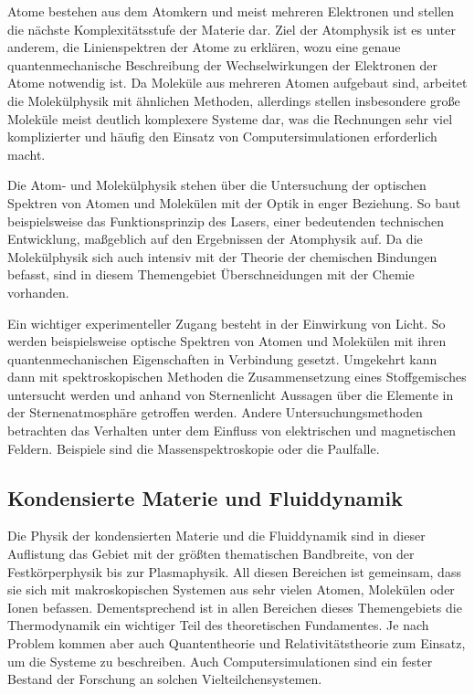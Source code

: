 \documentclass[titlepage, parkskip=full, twocolumn, landscape]{scrartcl}
\begin{document}
Atome bestehen aus dem Atomkern und meist mehreren Elektronen und stellen die nächste Komplexitätsstufe der Materie dar. Ziel der Atomphysik ist es unter anderem, die Linienspektren der Atome zu erklären, wozu eine genaue quantenmechanische Beschreibung der Wechselwirkungen der Elektronen der Atome notwendig ist. Da Moleküle aus mehreren Atomen aufgebaut sind, arbeitet die Molekülphysik mit ähnlichen Methoden, allerdings stellen insbesondere große Moleküle meist deutlich komplexere Systeme dar, was die Rechnungen sehr viel komplizierter und häufig den Einsatz von Computersimulationen erforderlich macht.

Die Atom- und Molekülphysik stehen über die Untersuchung der optischen Spektren von Atomen und Molekülen mit der Optik in enger Beziehung. So baut beispielsweise das Funktionsprinzip des Lasers, einer bedeutenden technischen Entwicklung, maßgeblich auf den Ergebnissen der Atomphysik auf. Da die Molekülphysik sich auch intensiv mit der Theorie der chemischen Bindungen befasst, sind in diesem Themengebiet Überschneidungen mit der Chemie vorhanden.

Ein wichtiger experimenteller Zugang besteht in der Einwirkung von Licht. So werden beispielsweise optische Spektren von Atomen und Molekülen mit ihren quantenmechanischen Eigenschaften in Verbindung gesetzt. Umgekehrt kann dann mit spektroskopischen Methoden die Zusammensetzung eines Stoffgemisches untersucht werden und anhand von Sternenlicht Aussagen über die Elemente in der Sternenatmosphäre getroffen werden. Andere Untersuchungsmethoden betrachten das Verhalten unter dem Einfluss von elektrischen und magnetischen Feldern. Beispiele sind die Massenspektroskopie oder die Paulfalle.

\subsection{Kondensierte Materie und Fluiddynamik}

Die Physik der kondensierten Materie und die Fluiddynamik sind in dieser Auflistung das Gebiet mit der größten thematischen Bandbreite, von der Festkörperphysik bis zur Plasmaphysik. All diesen Bereichen ist gemeinsam, dass sie sich mit makroskopischen Systemen aus sehr vielen Atomen, Molekülen oder Ionen befassen. Dementsprechend ist in allen Bereichen dieses Themengebiets die Thermodynamik ein wichtiger Teil des theoretischen Fundamentes. Je nach Problem kommen aber auch Quantentheorie und Relativitätstheorie zum Einsatz, um die Systeme zu beschreiben. Auch Computersimulationen sind ein fester Bestand der Forschung an solchen Vielteilchensystemen.
\end{document}
